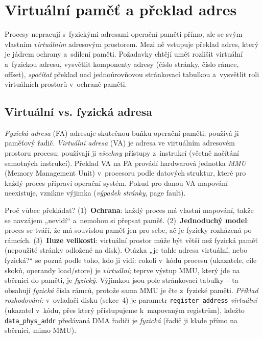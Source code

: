 \section{Virtuální paměť a překlad adres}

Procesy nepracují s~fyzickými adresami operační paměti přímo, ale se svým vlastním \emph{virtuálním} adresovým prostorem. Mezi ně vstupuje překlad adres, který je jádrem ochrany a~sdílení paměti. Požadavky chtějí umět rozlišit virtuální a~fyzickou adresu, vysvětlit komponenty adresy (číslo stránky, číslo rámce, offset), \emph{spočítat} překlad nad jednoúrovňovou stránkovací tabulkou a~vysvětlit roli virtuálních prostorů v~ochraně paměti.

\subsection{Virtuální vs. fyzická adresa}

\begin{definice}
\emph{Fyzická adresa} (FA) adresuje skutečnou buňku operační paměti; používá ji paměťový řadič. \emph{Virtuální adresa} (VA) je adresa ve virtuálním adresovém prostoru procesu; používají ji \emph{všechny} přístupy z~instrukcí (včetně načítání samotných instrukcí). Překlad VA na FA provádí hardwarová jednotka \emph{MMU} (Memory Management Unit) v~procesoru podle datových struktur, které pro každý proces připraví operační systém. Pokud pro danou VA mapování neexistuje, vznikne výjimka (\emph{výpadek stránky}, page fault).
\end{definice}

\begin{intuice}
Proč vůbec překládat? (1)~\textbf{Ochrana}: každý proces má vlastní mapování, takže se navzájem „nevidí`` a~nemohou si přepsat paměť. (2)~\textbf{Jednoduchý model}: proces se tváří, že má souvislou paměť jen pro sebe, ač je fyzicky rozházená po rámcích. (3)~\textbf{Iluze velikosti}: virtuální prostor může být větší než fyzická paměť (nepoužité stránky odložené na disk). Otázka „je tahle adresa virtuální, nebo fyzická?`` se pozná podle toho, kdo ji vidí: cokoli v~kódu procesu (ukazatele, cíle skoků, operandy load/store) je \emph{virtuální}; teprve výstup MMU, který jde na sběrnici do paměti, je \emph{fyzický}. Výjimkou jsou pole stránkovací tabulky -- ta obsahují \emph{fyzická} čísla rámců, protože sama MMU je čte z~fyzické paměti. \emph{Příklad rozhodování:} v~ovladači disku (sekce~4) je parametr \texttt{register\_address} \emph{virtuální} (ukazatel v~kódu, přes který přistupujeme k~mapovaným registrům), kdežto \texttt{data\_phys\_addr} předávaná DMA řadiči je \emph{fyzická} (řadič ji klade přímo na sběrnici, mimo MMU).
\end{intuice}

